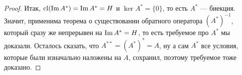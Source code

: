 \begin{proof}
	Итак, $\operatorname{cl}(\operatorname{Im} A^*) = \operatorname{Im} A^* = H$ и $\ker A^* = \{0\}$, то есть $A^*$ --- биекция. Значит, применима теорема о существовании обратного оператора $(A^*)^{-1}$, который сразу же непрерывен на $\operatorname{Im} A^* = H$, то есть требуемое про $A^*$ мы доказали. Осталось сказать, что $A^{**} = (A^*)^* = A$, ну а сам $A^*$ все условия, которые были изначально наложены на $A$, сохранил, поэтому требуемое тоже доказано.
\end{proof}